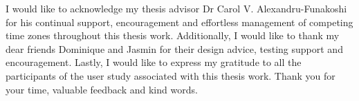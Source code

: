 
\begin{acknowledgements}
I would like to acknowledge my thesis advisor Dr Carol V. Alexandru-Funakoshi
for his continual support, encouragement and effortless management of competing time
zones throughout this thesis work. Additionally, I would like to thank my dear
friends Dominique and Jasmin for their design advice, testing support and
encouragement. Lastly, I would like to express my gratitude to all the
participants of the user study associated with this thesis work. Thank you for
your time, valuable feedback and kind words.

\end{acknowledgements}
